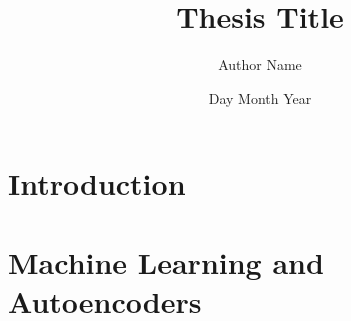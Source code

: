 \documentclass[12pt,twoside]{report}
\title{Thesis Title}
\author{Author Name}
\date{Day Month Year}
\begin{document}







\tableofcontents

\listoffigures

\listoftables



\chapter{Introduction}


\chapter{Machine Learning and Autoencoders}


% 

% 

% 

% 



\end{document}
